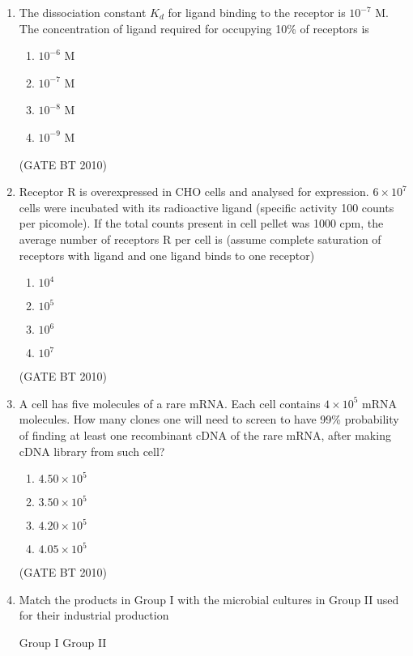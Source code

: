 \documentclass[journal,12pt,onecolumn]{IEEEtran}
\theoremstyle{remark}
\begin{document}
\begin{enumerate}
\item The dissociation constant $K_d$ for ligand binding to the receptor is $10^{-7}$ M. The concentration of ligand required for occupying 10\% of receptors is  

\begin{enumerate}
  \item $10^{-6}$ M  
  \item $10^{-7}$ M  
  \item $10^{-8}$ M  
  \item $10^{-9}$ M  
\end{enumerate}
\hfill (GATE BT 2010)

\item Receptor R is overexpressed in CHO cells and analysed for expression. $6 \times 10^7$ cells were incubated with its radioactive ligand (specific activity 100 counts per picomole). If the total counts present in cell pellet was 1000 cpm, the average number of receptors R per cell is (assume complete saturation of receptors with ligand and one ligand binds to one receptor)  

\begin{enumerate}
   \item $10^4$  
   \item $10^5$  
   \item $10^6$  
   \item $10^7$  
\end{enumerate}
\hfill (GATE BT 2010)

\item A cell has five molecules of a rare mRNA. Each cell contains $4 \times 10^5$ mRNA molecules. How many clones one will need to screen to have 99\% probability of finding at least one recombinant cDNA of the rare mRNA, after making cDNA library from such cell?  

\begin{enumerate}
   \item $4.50 \times 10^5$  
   \item $3.50 \times 10^5$  
   \item $4.20 \times 10^5$  
   \item $4.05 \times 10^5$  
\end{enumerate}
\hfill (GATE BT 2010)

\item Match the products in Group I with the microbial cultures in Group II used for their industrial production

Group I \hspace{3cm} Group II


\end{enumerate}
\end{document}
